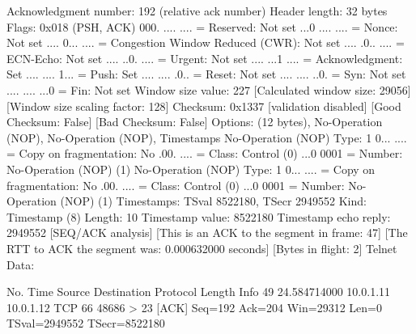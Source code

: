     Acknowledgment number: 192    (relative ack number)
    Header length: 32 bytes
    Flags: 0x018 (PSH, ACK)
        000. .... .... = Reserved: Not set
        ...0 .... .... = Nonce: Not set
        .... 0... .... = Congestion Window Reduced (CWR): Not set
        .... .0.. .... = ECN-Echo: Not set
        .... ..0. .... = Urgent: Not set
        .... ...1 .... = Acknowledgment: Set
        .... .... 1... = Push: Set
        .... .... .0.. = Reset: Not set
        .... .... ..0. = Syn: Not set
        .... .... ...0 = Fin: Not set
    Window size value: 227
    [Calculated window size: 29056]
    [Window size scaling factor: 128]
    Checksum: 0x1337 [validation disabled]
        [Good Checksum: False]
        [Bad Checksum: False]
    Options: (12 bytes), No-Operation (NOP), No-Operation (NOP), Timestamps
        No-Operation (NOP)
            Type: 1
                0... .... = Copy on fragmentation: No
                .00. .... = Class: Control (0)
                ...0 0001 = Number: No-Operation (NOP) (1)
        No-Operation (NOP)
            Type: 1
                0... .... = Copy on fragmentation: No
                .00. .... = Class: Control (0)
                ...0 0001 = Number: No-Operation (NOP) (1)
        Timestamps: TSval 8522180, TSecr 2949552
            Kind: Timestamp (8)
            Length: 10
            Timestamp value: 8522180
            Timestamp echo reply: 2949552
    [SEQ/ACK analysis]
        [This is an ACK to the segment in frame: 47]
        [The RTT to ACK the segment was: 0.000632000 seconds]
        [Bytes in flight: 2]
Telnet
    Data: 

No.     Time           Source                Destination           Protocol Length Info
     49 24.584714000   10.0.1.11             10.0.1.12             TCP      66     48686 > 23 [ACK] Seq=192 Ack=204 Win=29312 Len=0 TSval=2949552 TSecr=8522180

